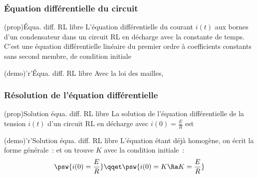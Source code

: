 \documentclass[../../main/main.tex]{subfiles}
\begin{document}
\subsubsection{Équation différentielle du circuit}
\begin{tcbraster}[raster columns=2, raster equal height=rows]
	\begin{tcb}[label=prop:eqdiffrl](prop){Équa. diff. RL libre}
		L'équation différentielle du courant $i(t)$ aux bornes d'un
		condensateur dans un circuit RL en décharge
		\psw{
			\[ \boxed{\dv{i}{t} + \frac{1}{\tau}i = 0}\]
		}
		avec  la constante de temps.
		\tcblower
		C'est une équation différentielle linéaire du premier ordre à
		coefficients constants sans second membre, de condition initiale
		\psw{
			\[ \boxed{i(0^-) = i(0^+) = \frac{E}{R}}\]
		}
	\end{tcb}
	\begin{tcb}[label=demo:eqdiffrl](demo)'r'{Équa. diff. RL libre}
		Avec la loi des mailles,
	\end{tcb}
\end{tcbraster}

\subsubsection{Résolution de l'équation différentielle}
\begin{tcbraster}[raster columns=2, raster equal height=rows]
	\begin{tcb}[label=prop:rlsoludech](prop){Solution équa. diff. RL libre}
		La solution de l'équation différentielle de la tension $i(t)$
		d'un circuit RL en décharge avec $i(0) = \frac{E}{R}$ est
		\psw{
			\[\boxed{i(t) = \frac{E}{R}\exp\left(-\frac{t}{\tau}\right)}\]
		}
	\end{tcb}
	\begin{tcb}[label=demo:rlsoludech](demo)'r'{Solution équa. diff. RL libre}
		L'équation étant déjà homogène, on écrit la forme générale~:
		\psw{
			\[i(t) = K\exp\left( -\frac{t}{\tau} \right)\]
		}
		et on trouve $K$ avec la condition initiale~:
		\[
			\psw{i(0) = \frac{E}{R}}
			\qqet
			\psw{i(0) = K \Ra K=\frac{E}{R}}
		\]
	\end{tcb}
\end{tcbraster}
\end{document}
